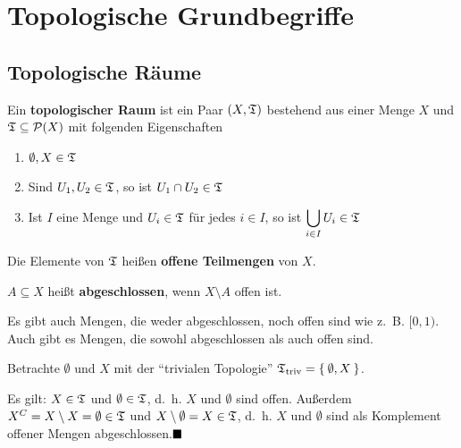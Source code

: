 \chapter{Topologische Grundbegriffe}
\section{Topologische Räume}
\begin{definition}   
    Ein \textbf{topologischer Raum} ist ein Paar $(X, \mathfrak{T})$ bestehend
    aus einer Menge $X$ und $\mathfrak{T} \subseteq \mathcal{P}(X)$ mit
    folgenden Eigenschaften
    \begin{enumerate}[label=(\roman*)]
        \item $\emptyset, X \in \mathfrak{T}$
        \item Sind $U_1, U_2 \in \mathfrak{T}$, so ist $U_1 \cap U_2 \in \mathfrak{T}$
        \item Ist $I$ eine Menge und $U_i \in \mathfrak{T}$ für jedes $i \in I$,
              so ist $\displaystyle \bigcup_{i \in I} U_i \in \mathfrak{T}$
    \end{enumerate}
    Die Elemente von $\mathfrak{T}$ heißen \textbf{offene Teilmengen} von $X$. 

    $A \subseteq X$ heißt \textbf{abgeschlossen}, wenn $X \setminus A$ offen ist.

\end{definition}

Es gibt auch Mengen, die weder abgeschlossen, noch offen sind wie z.~B. $[0,1)$.
Auch gibt es Mengen, die sowohl abgeschlossen als auch offen sind.

\begin{korollar}
    Betrachte $\emptyset$ und $X$ mit der \enquote{trivialen Topologie}
     $\mathfrak{T}_\text{triv} = \Set{\emptyset, X}$.

    Es gilt: $X \in \mathfrak{T}$ und $\emptyset \in \mathfrak{T}$, d.~h. $X$ und $\emptyset$
    sind offen. Außerdem $X^C = X \setminus X = \emptyset \in \mathfrak{T}$
    und $X \setminus \emptyset = X \in \mathfrak{T}$, d.~h. $X$ und $\emptyset$
    sind als Komplement offener Mengen abgeschlossen.$\qed$
\end{korollar}

